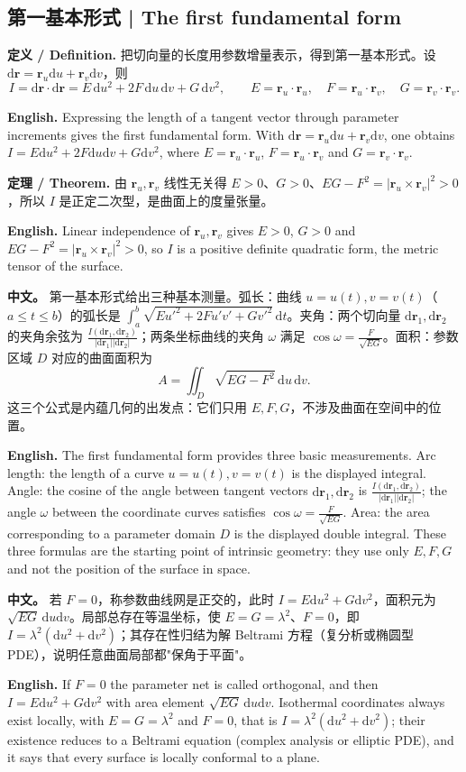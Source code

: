 \documentclass[UTF8,11pt,a4paper]{ctexart}
\newcommand{\APS}[2]{\par\noindent\textbf{中文。} #1\par\noindent\textbf{English.} #2\par\smallskip}
\newcommand{\EN}[1]{\par\noindent \textbf{English.} #1\par}
\newcommand{\DEF}[2]{\par\noindent\textbf{定义 / Definition.} #1\par\EN{#2}\par\smallskip}
\newcommand{\THM}[2]{\par\noindent\textbf{定理 / Theorem.} #1\par\EN{#2}\par\smallskip}
\newcommand{\dd}{\mathrm{d}}
\newcommand{\br}{\mathbf{r}}
\begin{document}
\subsection{第一基本形式 | The first fundamental form}
\DEF{把切向量的长度用参数增量表示，得到第一基本形式。设 $\dd\br=\br_u\dd u+\br_v\dd v$，则
\[
I=\dd\br\cdot\dd\br=E\,\dd u^2+2F\,\dd u\,\dd v+G\,\dd v^2,
\qquad
E=\br_u\cdot\br_u,\quad F=\br_u\cdot\br_v,\quad G=\br_v\cdot\br_v .
\]
}{Expressing the length of a tangent vector through parameter increments gives the first fundamental form. With $\dd\br=\br_u\dd u+\br_v\dd v$, one obtains $I=E\dd u^2+2F\dd u\dd v+G\dd v^2$, where $E=\br_u\cdot\br_u$, $F=\br_u\cdot\br_v$ and $G=\br_v\cdot\br_v$.}
\THM{由 $\br_u,\br_v$ 线性无关得 $E>0$、$G>0$、$EG-F^2=|\br_u\times\br_v|^2>0$，所以 $I$ 是正定二次型，是曲面上的度量张量。}{Linear independence of $\br_u,\br_v$ gives $E>0$, $G>0$ and $EG-F^2=|\br_u\times\br_v|^2>0$, so $I$ is a positive definite quadratic form, the metric tensor of the surface.}
\APS{第一基本形式给出三种基本测量。弧长：曲线 $u=u(t),v=v(t)$（$a\le t\le b$）的弧长是 $\int_a^b\sqrt{Eu'^2+2Fu'v'+Gv'^2}\,\dd t$。夹角：两个切向量 $\dd\br_1,\dd\br_2$ 的夹角余弦为 $\frac{I(\dd\br_1,\dd\br_2)}{|\dd\br_1||\dd\br_2|}$；两条坐标曲线的夹角 $\omega$ 满足 $\cos\omega=\frac{F}{\sqrt{EG}}$。面积：参数区域 $D$ 对应的曲面面积为
\[
A=\iint_D\sqrt{EG-F^2}\,\dd u\,\dd v .
\]
这三个公式是内蕴几何的出发点：它们只用 $E,F,G$，不涉及曲面在空间中的位置。}{The first fundamental form provides three basic measurements. Arc length: the length of a curve $u=u(t),v=v(t)$ is the displayed integral. Angle: the cosine of the angle between tangent vectors $\dd\br_1,\dd\br_2$ is $\frac{I(\dd\br_1,\dd\br_2)}{|\dd\br_1||\dd\br_2|}$; the angle $\omega$ between the coordinate curves satisfies $\cos\omega=\frac{F}{\sqrt{EG}}$. Area: the area corresponding to a parameter domain $D$ is the displayed double integral. These three formulas are the starting point of intrinsic geometry: they use only $E,F,G$ and not the position of the surface in space.}
\APS{若 $F=0$，称参数曲线网是正交的，此时 $I=E\dd u^2+G\dd v^2$，面积元为 $\sqrt{EG}\,\dd u\dd v$。局部总存在等温坐标，使 $E=G=\lambda^2$、$F=0$，即 $I=\lambda^2(\dd u^2+\dd v^2)$；其存在性归结为解 Beltrami 方程（复分析或椭圆型 PDE），说明任意曲面局部都"保角于平面"。}{If $F=0$ the parameter net is called orthogonal, and then $I=E\dd u^2+G\dd v^2$ with area element $\sqrt{EG}\,\dd u\dd v$. Isothermal coordinates always exist locally, with $E=G=\lambda^2$ and $F=0$, that is $I=\lambda^2(\dd u^2+\dd v^2)$; their existence reduces to a Beltrami equation (complex analysis or elliptic PDE), and it says that every surface is locally conformal to a plane.}
\end{document}
